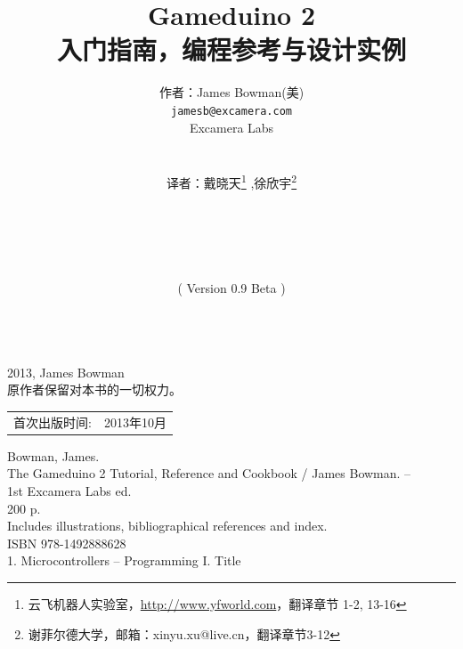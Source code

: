 \documentclass[10pt]{book}
\title{\LARGE \bf
Gameduino 2\\
入门指南，编程参考与设计实例
}
\author{作者：James Bowman(美) \\
	{\tt\small jamesb@excamera.com} \\
  Excamera Labs\\
   \\
   \\
  译者：戴晓天\footnote{云飞机器人实验室，\url{http://www.yfworld.com}，翻译章节 1-2, 13-16}
  ,徐欣宇\footnote{谢菲尔德大学，邮箱：xinyu.xu@live.cn，翻译章节3-12}\\
  \\
  \\
  \\
  \\
  \\
  ( Version 0.9 Beta )
  \\
  \\  
}
\date{}
\begin{document}
\begin{CJK}{UTF8}{gkai}
\maketitle

\begingroup
\footnotesize
\parindent 0pt
\parskip \baselineskip
\textcopyright{} 2013, James Bowman \\
原作者保留对本书的一切权力。

% 
% 
% 
% 

\begin{center}
\begin{tabular}{ll}
首次出版时间:  & 2013年10月 \\
\end{tabular}
\end{center}

\vfill

Bowman, James.\\
\hspace*{2em} The Gameduino 2 Tutorial, Reference and Cookbook / James Bowman. -- \\
\hspace*{1em} 1st Excamera Labs ed. \\
\hspace*{2em} 200 p. \hspace*{2em} \\
\hspace*{2em} Includes illustrations, bibliographical references and index. \\
\hspace*{2em} ISBN 978-1492888628 \\
\hspace*{2em} 1. Microcontrollers -- Programming \hspace*{2em} I. Title



\end{CJK}
\end{document}
